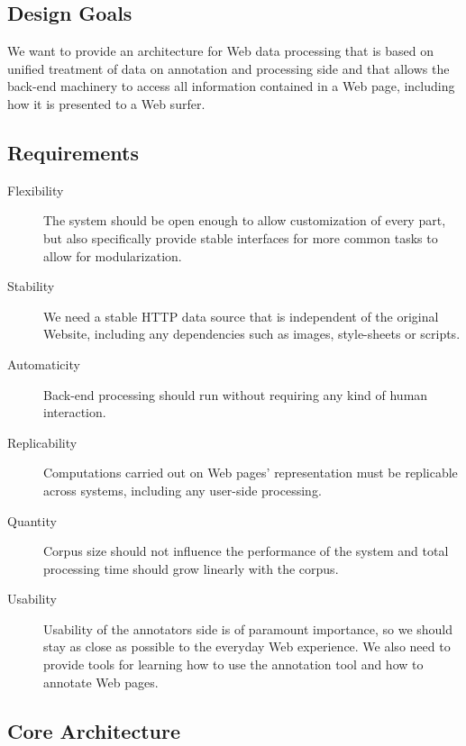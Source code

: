 \subsection{Design Goals}

We want to provide an architecture for Web data processing that is based on unified treatment of data on annotation and processing side
and that allows the back-end machinery to access all information contained in a Web page, including how it is presented to a Web surfer.

\subsection{Requirements}

\begin{description}

\item[Flexibility]
The system should be open enough to allow customization of every part, but also specifically provide stable interfaces for more common tasks to allow for modularization.

\item[Stability]
We need a stable HTTP data source that is independent of the original Website, including any dependencies such as images, style-sheets or scripts.

\item[Automaticity]
Back-end processing should run without requiring any kind of human interaction.

\item[Replicability]
Computations carried out on Web pages' representation must be replicable across systems, including any user-side processing.

\item[Quantity]
Corpus size should not influence the performance of the system and total processing time should grow linearly with the corpus.

\item[Usability]
Usability of the annotators side is of paramount importance, so we should stay as close as possible to the everyday Web experience.
We also need to provide tools for learning how to use the annotation tool and how to annotate Web pages.

\end{description}

\subsection{Core Architecture}


